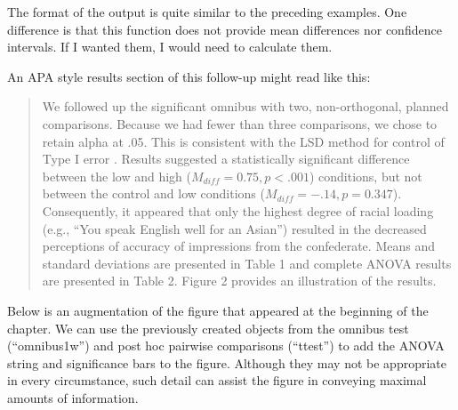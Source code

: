 \documentclass[
  11pt,
]{book}
\begin{document}
The format of the output is quite similar to the preceding examples. One difference is that this function does not provide mean differences nor confidence intervals. If I wanted them, I would need to calculate them.

An APA style results section of this follow-up might read like this:

\begin{quote}
We followed up the significant omnibus with two, non-orthogonal, planned comparisons. Because we had fewer than three comparisons, we chose to retain alpha at .05. This is consistent with the LSD method for control of Type I error \citep{green_using_2017}. Results suggested a statistically significant difference between the low and high (\(M_{diff} = 0.75, p < .001\)) conditions, but not between the control and low conditions (\(M_{diff} = -.14, p = 0.347\)). Consequently, it appeared that only the highest degree of racial loading (e.g., ``You speak English well for an Asian'') resulted in the decreased perceptions of accuracy of impressions from the confederate. Means and standard deviations are presented in Table 1 and complete ANOVA results are presented in Table 2. Figure 2 provides an illustration of the results.
\end{quote}

Below is an augmentation of the figure that appeared at the beginning of the chapter. We can use the previously created objects from the omnibus test (``omnibus1w'') and post hoc pairwise comparisons (``ttest'') to add the ANOVA string and significance bars to the figure. Although they may not be appropriate in every circumstance, such detail can assist the figure in conveying maximal amounts of information.
\end{document}

